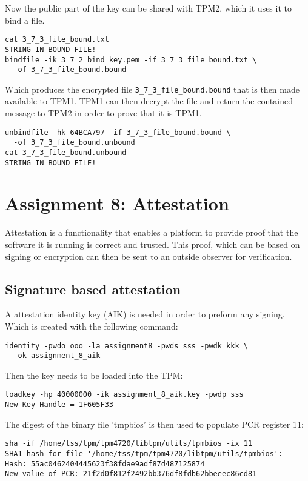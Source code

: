 \documentclass[10pt]{article}
\begin{document}
      Now the public part of the key can be shared with TPM2, which it uses it
      to bind a file.

\begin{verbatim}
cat 3_7_3_file_bound.txt
STRING IN BOUND FILE!
bindfile -ik 3_7_2_bind_key.pem -if 3_7_3_file_bound.txt \
  -of 3_7_3_file_bound.bound
\end{verbatim}

      Which produces the encrypted file \texttt{3\_7\_3\_file\_bound.bound}
      that is then made available to TPM1. TPM1 can then decrypt the file and
      return the contained message to TPM2 in order to prove that it is TPM1.

\begin{verbatim}
unbindfile -hk 64BCA797 -if 3_7_3_file_bound.bound \
  -of 3_7_3_file_bound.unbound
cat 3_7_3_file_bound.unbound
STRING IN BOUND FILE!
\end{verbatim}

\section{Assignment 8: Attestation}

  Attestation is a functionality that enables a platform to provide proof that
  the software it is running is correct and trusted. This proof, which can be
  based on signing or encryption can then be sent to an outside observer for
  verification.

  \subsection{Signature based attestation}

    A attestation identity key (AIK) is needed in order to preform any signing.
    Which is created with the following command:
\begin{verbatim}
identity -pwdo ooo -la assignment8 -pwds sss -pwdk kkk \
  -ok assignment_8_aik
\end{verbatim}

    Then the key needs to be loaded into the TPM:

\begin{verbatim}
loadkey -hp 40000000 -ik assignment_8_aik.key -pwdp sss
New Key Handle = 1F605F33
\end{verbatim}

    The digest of the binary file 'tmpbios' is then used to populate PCR
    register 11:

\begin{verbatim}
sha -if /home/tss/tpm/tpm4720/libtpm/utils/tpmbios -ix 11
SHA1 hash for file '/home/tss/tpm/tpm4720/libtpm/utils/tpmbios':
Hash: 55ac0462404445623f38fdae9adf87d487125874
New value of PCR: 21f2d0f812f2492bb376df8fdb62bbeeec86cd81
\end{verbatim}
\end{document}
